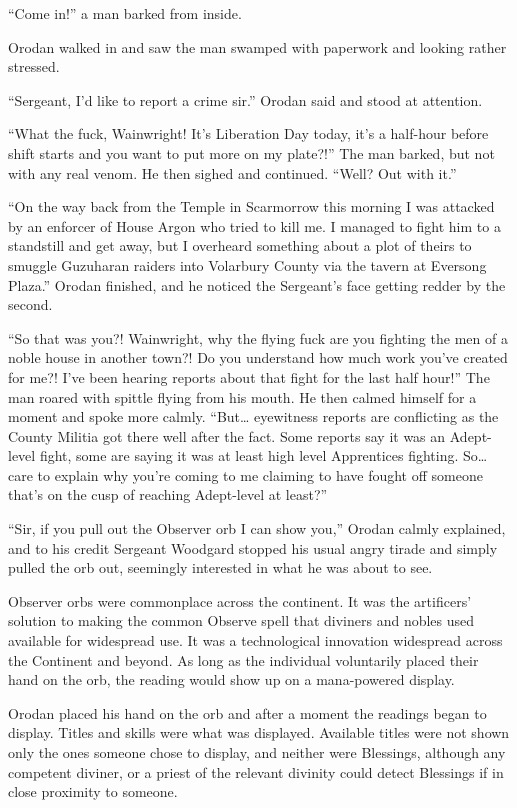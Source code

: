 \documentclass[a4paper,10pt]{book}
\begin{document}
“Come in!” a man barked from inside.\par
Orodan walked in and saw the man swamped with paperwork and looking rather stressed.\par
“Sergeant, I’d like to report a crime sir.” Orodan said and stood at attention.\par
“What the fuck, Wainwright! It’s Liberation Day today, it’s a half-hour before shift starts and you want to put more on my plate?!” The man barked, but not with any real venom. He then sighed and continued. “Well? Out with it.”\par
“On the way back from the Temple in Scarmorrow this morning I was attacked by an enforcer of House Argon who tried to kill me. I managed to fight him to a standstill and get away, but I overheard something about a plot of theirs to smuggle Guzuharan raiders into Volarbury County via the tavern at Eversong Plaza.” Orodan finished, and he noticed the Sergeant’s face getting redder by the second.\par
“So that was you?! Wainwright, why the flying fuck are you fighting the men of a noble house in another town?! Do you understand how much work you’ve created for me?! I’ve been hearing reports about that fight for the last half hour!” The man roared with spittle flying from his mouth. He then calmed himself for a moment and spoke more calmly. “But… eyewitness reports are conflicting as the County Militia got there well after the fact. Some reports say it was an Adept-level fight, some are saying it was at least high level Apprentices fighting. So… care to explain why you’re coming to me claiming to have fought off someone that’s on the cusp of reaching Adept-level at least?”\par
“Sir, if you pull out the Observer orb I can show you,” Orodan calmly explained, and to his credit Sergeant Woodgard stopped his usual angry tirade and simply pulled the orb out, seemingly interested in what he was about to see.\par
Observer orbs were commonplace across the continent. It was the artificers’ solution to making the common Observe spell that diviners and nobles used available for widespread use. It was a technological innovation widespread across the Continent and beyond. As long as the individual voluntarily placed their hand on the orb, the reading would show up on a mana-powered display.\par
Orodan placed his hand on the orb and after a moment the readings began to display. Titles and skills were what was displayed. Available titles were not shown only the ones someone chose to display, and neither were Blessings, although any competent diviner, or a priest of the relevant divinity could detect Blessings if in close proximity to someone.\par
\end{document}
